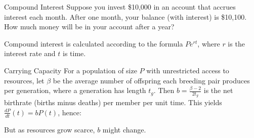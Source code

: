 \begin{frame}[t]{Compound Interest}
\AnswerSpace{}
Suppose you invest \$10,000 in an account that accrues interest each month. After one month, your balance (with interest) is \$10,100. How much money will be in your account after a year?\pause\vfill\color{answercolor}

Compound interest is calculated according to the formula $Pe^{rt}$, where $r$ is the interest rate and $t$ is time.\pause\vfill

\small
{}
\end{frame}

\begin{frame}[t]{Carrying Capacity}
For a population of size $P$ with unrestricted access to resources, let $\beta$ be the average number of offspring each breeding pair produces per generation, where a generation has length $t_g$. Then \alert<3>{$b=\frac{\beta-2}{2t_g}$ is the net birthrate (births minus deaths) per member per unit time}. This yields \alert<1>{$\frac{dP}{dt}(t) = bP(t)$}, hence:\pause
\answer{\[P(t)=P(0)e^{bt}\]}
\vfill\pause

But as resources grow scarce, $b$ might change.

\end{frame}

